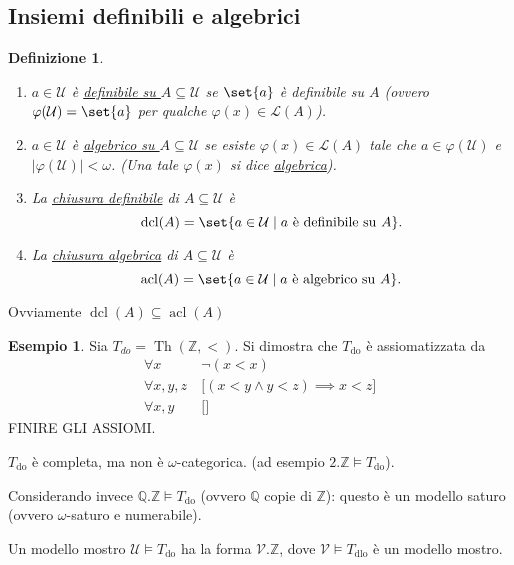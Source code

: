 \documentclass[10pt]{article}
\newcommand{\card}[1]{\left\vert #1 \right\vert}
\newcommand{\1}{\mathds{1}}
\newcommand{\Q}{\mathds{Q}}
\newcommand{\Z}{\mathds{Z}}
\theoremstyle{definition}%
\newtheorem{esempio}[thm]{Esempio}
\theoremstyle{plain}
\newtheorem{definizione}[thm]{Definizione}
\theoremstyle{remark}
\begin{document}
\subsection{Insiemi definibili e algebrici}
\label{sec:org1e79753}

\begin{definizione}
\begin{enumerate}
\item \(a \in \mathcal{U}\) è \uline{definibile su \(A \subseteq\mathcal{U}\)} se \(\set{a}\) è definibile su \(A\) (ovvero \(\varphi(\mathcal{U})=\set{a}\) per qualche \(\varphi(x) \in \mathcal{L}(A)\)).
\item \(a \in \mathcal{U}\) è \uline{algebrico su \(A \subseteq \mathcal{U}\)} se esiste \(\varphi(x) \in \mathcal{L}(A)\) tale che \(a \in \varphi(\mathcal{U})\) e \(\card{\varphi(\mathcal{U})}<\omega\). (Una tale \(\varphi(x)\) si dice \uline{algebrica}).
\item La \uline{chiusura definibile} di \(A \subseteq \mathcal{U}\) è
\begin{equation*}
 \operatorname{dcl}(A) = \set{a \in \mathcal{U}\mid a\text{ è definibile su }A}.
\end{equation*}
\item La \uline{chiusura algebrica} di \(A \subseteq \mathcal{U}\) è
\begin{equation*}
 \operatorname{acl}(A) = \set{a \in \mathcal{U}\mid a\text{ è algebrico su }A}.
\end{equation*}
\end{enumerate}
\end{definizione}

Ovviamente \(\operatorname{dcl}(A) \subseteq \operatorname{acl}(A)\)

\begin{esempio}
Sia \(T_{do} =\operatorname{Th}(\Z,<)\). Si dimostra che \(T_{\text{do}}\) è assiomatizzata da
\begin{align*}
\forall x\ &\lnot(x<x)\\
\forall x,y,z\ &\big[(x<y \land y<z)\implies x<z\big]\\
\forall x,y\ &\big[\big]
\end{align*}
FINIRE GLI ASSIOMI.

\(T_{\text{do}}\) è completa, ma non è \(\omega\)-categorica. (ad esempio \(2.\Z\vDash T_{\text{do}}\)).

Considerando invece \(\Q.\Z\vDash T_{\text{do}}\) (ovvero \(\Q\) copie di \(\Z\)): questo è un modello saturo (ovvero \(\omega\)-saturo e numerabile).

Un modello mostro \(\mathcal{U}\vDash T_{\text{do}}\) ha la forma \(\mathcal{V}.\Z\), dove \(\mathcal{V}\vDash T_{\text{dlo}}\) è un modello mostro.
\end{esempio}
\end{document}
